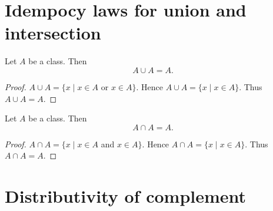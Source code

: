 \documentclass[../../set-theory/set-theory.tex]{subfiles}
\begin{document}
  \section*{Idempocy laws for union and intersection}

  \begin{forthel}
    \begin{proposition}
      Let $A$ be a class.
      Then \[ A \cup A = A. \]
    \end{proposition}
    \begin{proof}
      $A \cup A = \{x \mid x \in A$ or $x \in A \}$.
      Hence $A \cup A = \{ x \mid x \in A \}$.
      Thus $A \cup A = A$.
    \end{proof}
  \end{forthel}

  \begin{forthel}
    \begin{proposition}
      Let $A$ be a class.
      Then \[ A \cap A = A. \]
    \end{proposition}
    \begin{proof}
      $A \cap A = \{ x \mid x \in A$ and $x \in A \}$.
      Hence $A \cap A = \{ x \mid x \in A \}$.
      Thus $A \cap A = A$.
    \end{proof}
  \end{forthel}


  \section*{Distributivity of complement}
\end{document}
